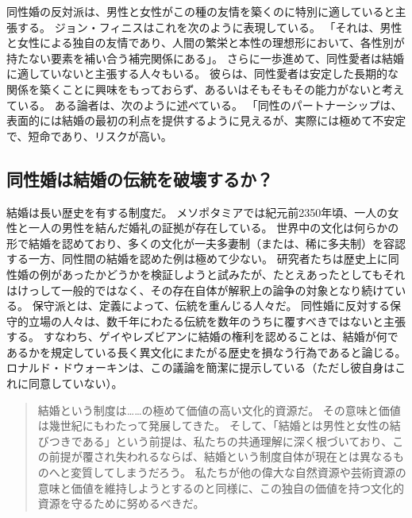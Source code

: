 \documentclass[paper=a4,book,openany]{jlreq}
\newcommand{\ig}[1]{}           %
\begin{document}
同性婚の反対派は、男性と女性がこの種の友情を築くのに特別に適していると主張する。
ジョン・フィニスはこれを次のように表現している。
「それは、男性と女性による独自の友情であり、人間の繁栄と本性の理想形において、各性別が持たない要素を補い合う補完関係にある」\citep[p.398]{finnis08:_marriag}。
さらに一歩進めて、同性愛者は結婚に適していないと主張する人々もいる。
彼らは、同性愛者は安定した長期的な関係を築くことに興味をもっておらず、あるいはそもそもその能力がないと考えている。
ある論者は、次のように述べている。
「同性のパートナーシップは、表面的には結婚の最初の利点を提供するように見えるが、実際には極めて不安定で、短命であり、リスクが高い\citep{fischer13:_purpos_marriag}。

\subsection{同性婚は結婚の伝統を破壊するか？}

結婚は長い歴史を有する制度だ。
メソポタミアでは紀元前2350年頃、一人の女性と一人の男性を結んだ婚礼の証拠が存在している。
世界中の文化は何らかの形で結婚を認めており、多くの文化が一夫多妻制（または、稀に多夫制）を容認する一方、同性間の結婚を認めた例は極めて少ない。
研究者たちは歴史上に同性婚の例があったかどうかを検証しようと試みたが、たとえあったとしてもそれはけっして一般的ではなく、その存在自体が解釈上の論争の対象となり続けている\citep{boswell94:_same_sex_union_pre_moder_europ,shaw94:_review_boswel}。
保守派とは、定義によって、伝統を重んじる人々だ。
同性婚に反対する保守的立場の人々は、数千年にわたる伝統を数年のうちに覆すべきではないと主張する。
すなわち、ゲイやレズビアンに結婚の権利を認めることは、結婚が何であるかを規定している長く異文化にまたがる歴史を損なう行為であると論じる。
ロナルド・ドウォーキン\ig{Ronald Dworkin}は、この議論を簡潔に提示している（ただし彼自身はこれに同意していない）。

\begin{quote}

結婚という制度は……の極めて価値の高い文化的資源だ。
その意味と価値は幾世紀にもわたって発展してきた。
そして、「結婚とは男性と女性の結びつきである」という前提は、私たちの共通理解に深く根づいており、この前提が覆され失われるならば、結婚という制度自体が現在とは異なるものへと変質してしまうだろう。
私たちが他の偉大な自然資源や芸術資源の意味と価値を維持しようとするのと同様に、この独自の価値を持つ文化的資源を守るために努めるべきだ。
\citep[pp.87--88]{dworkin06:_is_democ_possib_here}

\end{quote}
\end{document}
